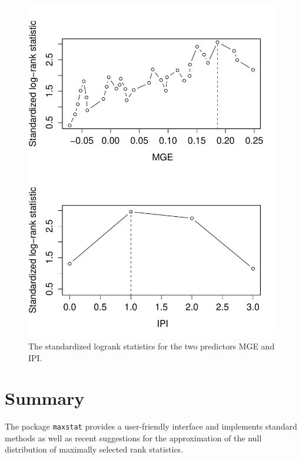 \documentclass{article}
\begin{document}
\begin{figure}[ht]
\begin{center}
\includegraphics{maxstat-mmax-fig}
\caption{The standardized logrank statistics for the two predictors MGE and
IPI. \label{plotmmax}}
\end{center}
\end{figure}

\section{Summary}

The package \texttt{maxstat} provides a user-friendly interface and 
implements standard methods as well as recent suggestions for the 
approximation of the null distribution of maximally selected rank statistics.




\end{document}
